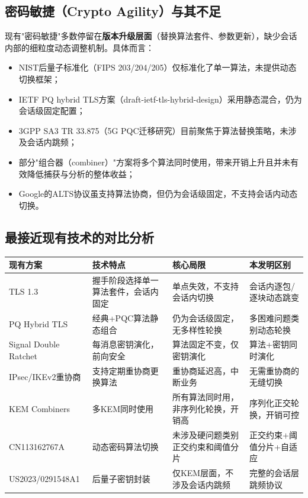 ﻿\documentclass[12pt,a4paper]{article}
\begin{document}
\subsection*{密码敏捷（Crypto Agility）与其不足}

现有"密码敏捷"多数停留在\textbf{版本升级层面}（替换算法套件、参数更新），缺少会话内部的细粒度动态调整机制。具体而言：

\begin{itemize}
    \item NIST后量子标准化（FIPS 203/204/205）仅标准化了单一算法，未提供动态切换框架；
    \item IETF PQ hybrid TLS方案（draft-ietf-tls-hybrid-design）采用静态混合，仍为会话级固定配置；
    \item 3GPP SA3 TR 33.875（5G PQC迁移研究）目前聚焦于算法替换策略，未涉及会话内跳频；
    \item 部分"组合器（combiner）"方案将多个算法同时使用，带来开销上升且并未有效降低捕获与分析的整体收益；
    \item Google的ALTS协议虽支持算法协商，但仍为会话级固定，不支持会话内动态切换。
\end{itemize}

\subsection*{最接近现有技术的对比分析}

\begingroup
\small
\setlength{\tabcolsep}{4pt}
\begin{longtable}{|>{\raggedright\arraybackslash}p{2.1cm}|>{\raggedright\arraybackslash}p{3.5cm}|>{\raggedright\arraybackslash}p{3.5cm}|>{\raggedright\arraybackslash}p{3.5cm}|}
\hline
\textbf{现有方案} & \textbf{技术特点} & \textbf{核心局限} & \textbf{本发明区别} \\
\hline
\endhead
TLS 1.3 & 握手阶段选择单一算法套件，会话内固定 & 单点失效，不支持会话内切换 & 会话内逐包/逐块动态跳变 \\
\hline
PQ Hybrid TLS & 经典+PQC算法静态组合 & 仍为会话级固定，无多样性轮换 & 多困难问题类别动态轮换 \\
\hline
Signal Double Ratchet & 每消息密钥演化，前向安全 & 算法固定不变，仅密钥演化 & 算法+密钥同时演化 \\
\hline
IPsec/\allowbreak IKEv2重协商 & 支持定期重协商更换算法 & 重协商延迟高，中断业务 & 无需重协商的无缝切换 \\
\hline
KEM Combiners & 多KEM同时使用 & 所有算法同时用，非序列化轮换，开销高 & 序列化正交轮换，开销可控 \\
\hline
CN11316\allowbreak 2767A & 动态密码算法切换 & 未涉及硬问题类别正交约束和阈值分片 & 正交约束+阈值分片+自适应 \\
\hline
US2023/\allowbreak 0291548A1 & 后量子密钥封装 & 仅KEM层面，不涉及会话内跳频 & 完整的会话层跳频协议 \\
\hline
\end{longtable}
\endgroup
\end{document}
